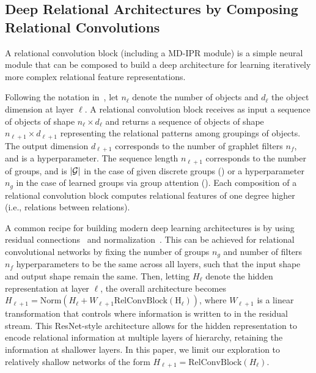 \subsection{Deep Relational Architectures by Composing Relational Convolutions}

A relational convolution block (including a MD-IPR module) is a simple neural module that can be composed to build a deep architecture for learning iteratively more complex relational feature representations.

Following the notation in~, let $n_\ell$ denote the number of objects and $d_\ell$ the object dimension at layer $\ell$. A relational convolution block receives as input a sequence of objects of shape $n_\ell \times d_{\ell}$ and returns a sequence of objects of shape $n_{\ell+1} \times d_{\ell + 1}$ representing the relational patterns among groupings of objects. The output dimension $d_{\ell+1}$ corresponds to the number of graphlet filters $n_f$, and is a hyperparameter. The sequence length $n_{\ell+1}$ corresponds to the number of groups, and is $\lvert {\mathcal{G}} \rvert$ in the case of given discrete groups () or a hyperparameter $n_g$ in the case of learned groups via group attention (). Each composition of a relational convolution block computes relational features of one degree higher (i.e., relations between relations).

A common recipe for building modern deep learning architectures is by using residual connections~\citep{he2016deep} and normalization~\citep{ba2016layernormalization}. This can be achieved for relational convolutional networks by fixing the number of groups $n_g$ and number of filters $n_f$ hyperparameters to be the same across all layers, such that the input shape and output shape remain the same. Then, letting $H_\ell$ denote the hidden representation at layer $\ell$, the overall architecture becomes $H_{\ell+1} = \mathrm{Norm}(H_{\ell} + W_{\ell+1} \mathrm{RelConvBlock(H_{\ell})})$, where $W_{\ell+1}$ is a linear transformation that controls where information is written to in the residual stream. This ResNet-style architecture allows for the hidden representation to encode relational information at multiple layers of hierarchy, retaining the information at shallower layers. In this paper, we limit our exploration to relatively shallow networks of the form $H_{\ell+1} = \mathrm{RelConvBlock}(H_{\ell})$.